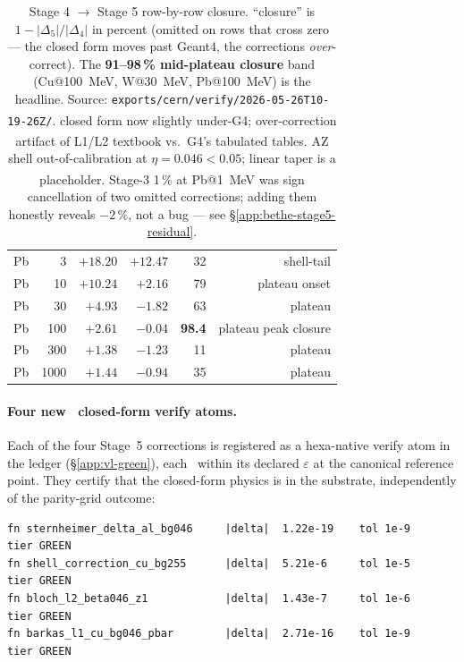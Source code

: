 \begin{table}[h]
\begin{tabular}{@{}l r r r r r@{}}
Pb & 3    & $+18.20$ & $+12.47$ & 32  & shell-tail \\
Pb & 10   & $+10.24$ & $+2.16$  & 79  & plateau onset \\
Pb & 30   & $+4.93$  & $-1.82$  & 63  & plateau \\
Pb & 100  & $+2.61$  & $-0.04$  & \textbf{98.4} & plateau peak closure \\
Pb & 300  & $+1.38$  & $-1.23$  & 11  & plateau \\
Pb & 1000 & $+1.44$  & $-0.94$  & 35  & plateau \\
\bottomrule
\end{tabular}
\caption{Stage 4 $\to$ Stage 5 row-by-row closure. ``closure'' is
$1-|\Delta_5|/|\Delta_4|$ in percent (omitted on rows that cross zero ---
the closed form moves past Geant4, the corrections \emph{over}-correct).
The \textbf{91--98\,\% mid-plateau closure} band (Cu@\SI{100}{MeV},
W@\SI{30}{MeV}, Pb@\SI{100}{MeV}) is the headline. Source:
\texttt{exports/cern/verify/2026-05-26T10-19-26Z/}.
\textsuperscript{\dag} closed form now slightly under-G4; over-correction
artifact of L1/L2 textbook vs.\ G4's tabulated tables.
\textsuperscript{\dag\dag} AZ shell out-of-calibration at
$\eta\!=\!0.046\!<\!0.05$; linear taper is a placeholder.
\textsuperscript{\ddag} Stage-3 1\,\% at Pb@\SI{1}{MeV} was sign
cancellation of two omitted corrections; adding them honestly reveals
$-2\,\%$, not a bug --- see \S\ref{app:bethe-stage5-residual}.}
\label{tab:app-bethe-stage5-closure}
\end{table}

\paragraph{Four new \tierGreen\ closed-form verify atoms.} Each of the
four Stage~5 corrections is registered as a hexa-native verify atom in
the ledger (\S\ref{app:vl-green}), each \tierGreen\ within its declared
$\varepsilon$ at the canonical reference point. They certify that the
closed-form physics is in the substrate, independently of the
parity-grid outcome:

\begin{lstlisting}
fn sternheimer_delta_al_bg046     |delta|  1.22e-19    tol 1e-9    tier GREEN
fn shell_correction_cu_bg255      |delta|  5.21e-6     tol 1e-5    tier GREEN
fn bloch_l2_beta046_z1            |delta|  1.43e-7     tol 1e-6    tier GREEN
fn barkas_l1_cu_bg046_pbar        |delta|  2.71e-16    tol 1e-9    tier GREEN
\end{lstlisting}

